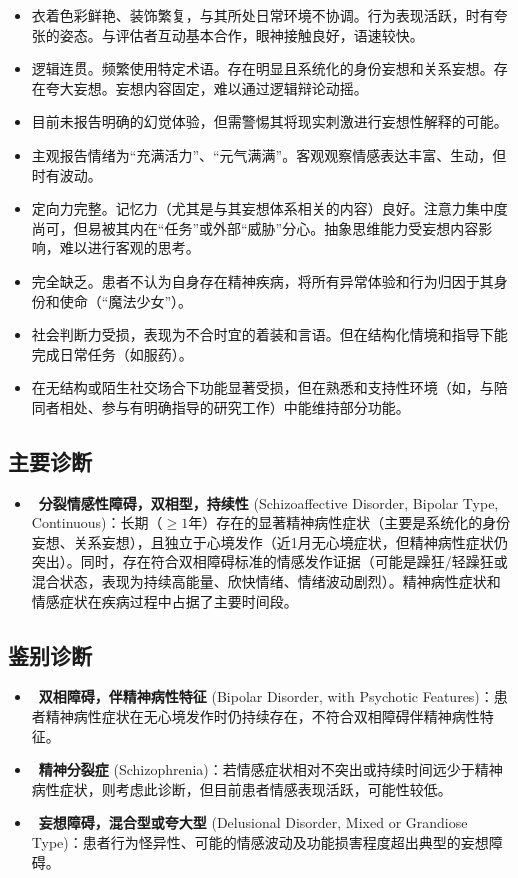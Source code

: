 \begin{itemize}
\item{} 衣着色彩鲜艳、装饰繁复，与其所处日常环境不协调。行为表现活跃，时有夸张的姿态。与评估者互动基本合作，眼神接触良好，语速较快。
\item{} 逻辑连贯。频繁使用特定术语。存在明显且系统化的身份妄想和关系妄想。存在夸大妄想。妄想内容固定，难以通过逻辑辩论动摇。
\item{} 目前未报告明确的幻觉体验，但需警惕其将现实刺激进行妄想性解释的可能。
\item{} 主观报告情绪为“充满活力”、“元气满满”。客观观察情感表达丰富、生动，但时有波动。
\item{} 定向力完整。记忆力（尤其是与其妄想体系相关的内容）良好。注意力集中度尚可，但易被其内在“任务”或外部“威胁”分心。抽象思维能力受妄想内容影响，难以进行客观的思考。
\item{} 完全缺乏。患者不认为自身存在精神疾病，将所有异常体验和行为归因于其身份和使命（“魔法少女”）。
\item{} 社会判断力受损，表现为不合时宜的着装和言语。但在结构化情境和指导下能完成日常任务（如服药）。
\item{} 在无结构或陌生社交场合下功能显著受损，但在熟悉和支持性环境（如，与陪同者相处、参与有明确指导的研究工作）中能维持部分功能。
\end{itemize}

\subsection*{主要诊断}

\begin{itemize}
\item{} ~\textbf{分裂情感性障碍，双相型，持续性} (Schizoaffective Disorder, Bipolar Type, Continuous)：长期（\(\ge 1\)年）存在的显著精神病性症状（主要是系统化的身份妄想、关系妄想），且独立于心境发作（近1月无心境症状，但精神病性症状仍突出）。同时，存在符合双相障碍标准的情感发作证据（可能是躁狂/轻躁狂或混合状态，表现为持续高能量、欣快情绪、情绪波动剧烈）。精神病性症状和情感症状在疾病过程中占据了主要时间段。
\end{itemize}

\subsection*{鉴别诊断}

\begin{itemize}
\item{} ~\textbf{双相障碍，伴精神病性特征} (Bipolar Disorder, with Psychotic Features)：患者精神病性症状在无心境发作时仍持续存在，不符合双相障碍伴精神病性特征。
\item{} ~\textbf{精神分裂症} (Schizophrenia)：若情感症状相对不突出或持续时间远少于精神病性症状，则考虑此诊断，但目前患者情感表现活跃，可能性较低。
\item{} ~\textbf{妄想障碍，混合型或夸大型} (Delusional Disorder, Mixed or Grandiose Type)：患者行为怪异性、可能的情感波动及功能损害程度超出典型的妄想障碍。
\end{itemize}

